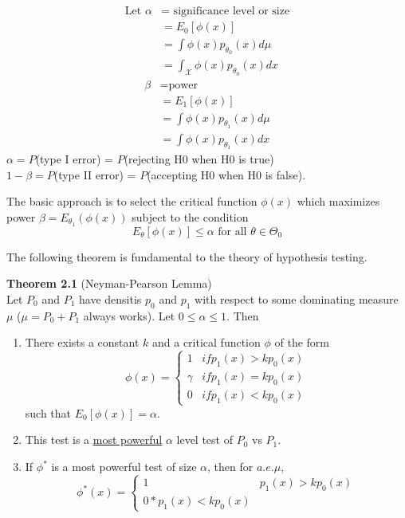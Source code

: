 \documentclass[12pt]{article}
\numberwithin{equation}{section}
\begin{document}
\begin{align*}
  \text{Let } \alpha &= \text{ significance level or size} \\
    &= E_0[\phi(x)] \\
    &= \int \phi(x) p_{\theta_0}(x) d\mu \\
    &= \int_{\mathcal{X}} \phi(x) p_{\theta_0}(x) dx
\end{align*}
%
\begin{align*}
  \beta &= \text{power} \\
    &= E_1[\phi(x)] \\
    &= \int \phi(x) p_{\theta_1}(x) d\mu \\
    &= \int \phi(x) p_{\theta_1}(x) dx
\end{align*}
$\alpha = P$(type I error) = $P$(rejecting H0 when H0 is true) \\
$1 - \beta  = P$(type II error) = $P$(accepting H0 when H0 is false).

The basic approach is to select the critical function $\phi(x)$ which maximizes power $\beta = E_{\theta_1}(\phi(x))$ subject to the condition
\begin{equation*}
  E_{\theta}[\phi(x)] \le \alpha \text{ for all } \theta \in \Theta_0
\end{equation*}

The following theorem is fundamental to the theory of hypothesis testing.

\textbf{Theorem 2.1} (Neyman-Pearson Lemma) \\
Let $P_0$ and $P_1$ have densitis $p_0$ and $p_1$ with respect to some dominating measure $\mu$ ($\mu = P_0 + P_1$ always works). Let $0 \le \alpha \le 1$. Then
\begin{enumerate}
  \item There exists a constant $k$ and a critical function $\phi$ of the form
  \begin{equation*}
    \phi(x) =
    \begin{cases}
      1      & if p_1(x) > k p_0(x) \\
      \gamma & if p_1(x) = k p_0(x) \\
      0      & if p_1(x) < k p_0(x)
    \end{cases}
  \end{equation*}
  such that $E_0[\phi(x)] = \alpha$.
  \item This test is a \underline{most powerful} $\alpha$ level test of $P_0$ vs $P_1$.
  \item If $\phi^*$ is a most powerful test of size $\alpha$, then for $a.e.\mu$,
  \begin{equation*}
    \phi^*(x) = 
    \begin{cases}
      1 & p_1(x) > k p_0(x) \\
      0 * p_1(x) < k p_0(x)
    \end{cases}
  \end{equation*}
\end{enumerate}
\end{document}
